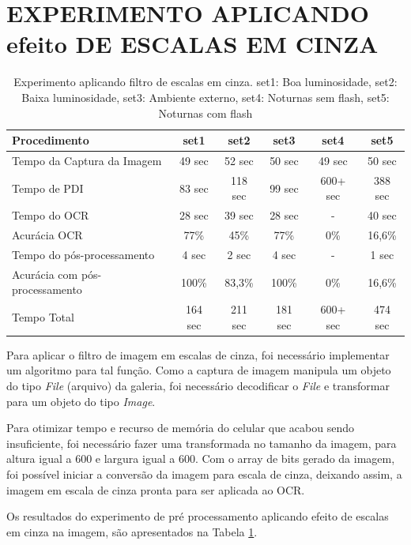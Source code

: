 \section{EXPERIMENTO APLICANDO efeito DE ESCALAS EM CINZA}

\begin{table}[]
\centering
\begin{tabular}{lccccc}
\hline
Procedimento & set1 & set2 & set3 & set4 & set5 \\ \hline
Tempo da Captura da Imagem & 49 sec & 52 sec & 50 sec & 49 sec & 50 sec \\
Tempo de PDI & 83 sec & 118 sec & 99 sec & 600+ sec & 388 sec \\
Tempo do OCR & 28 sec & 39 sec & 28 sec & - & 40 sec \\
Acurácia OCR & 77\% & 45\% & 77\% & 0\% & 16,6\% \\
Tempo do pós-processamento & 4 sec & 2 sec & 4 sec & - & 1 sec \\
Acurácia com pós-processamento & 100\% & 83,3\% & 100\% & 0\% & 16,6\% \\
Tempo Total & 164 sec & 211 sec & 181 sec & 600+ sec & 474 sec \\ \hline
\end{tabular}

\caption{Experimento aplicando filtro de escalas em cinza. set1: Boa luminosidade, set2: Baixa luminosidade, set3: Ambiente externo, set4: Noturnas sem flash, set5: Noturnas com flash}
	\label{tab:exp_grey_scale}

\end{table}
Para aplicar o filtro de imagem em escalas de cinza, foi necessário implementar um algoritmo para tal função. Como a captura de imagem manipula um objeto do tipo \textit{File} (arquivo) da galeria, foi necessário decodificar o \textit{File} e transformar para um objeto do tipo \textit{Image}. 

Para otimizar tempo e recurso de memória do celular que acabou sendo insuficiente, foi necessário fazer uma transformada no tamanho da imagem, para altura igual a 600 e largura igual a 600. Com o array de bits gerado da imagem, foi possível iniciar a conversão da imagem para escala de cinza, deixando assim, a imagem em escala de cinza pronta para ser aplicada ao OCR.


Os resultados do experimento de pré processamento aplicando efeito de escalas em cinza na imagem, são apresentados na Tabela \ref{tab:exp_grey_scale}.







